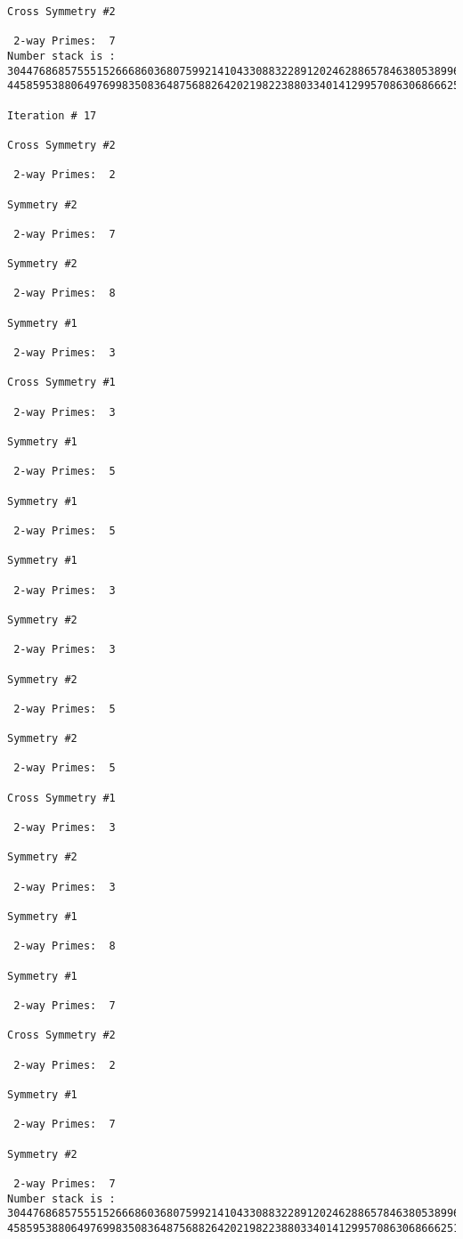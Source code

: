 \begin{verbatim}
Cross Symmetry #2

 2-way Primes: 	7
Number stack is :
30447686857555152666860368075992141043308832289120246288657846380538996794608835958544046240163340857
44585953880649769983508364875688264202198223880334014129957086306866625155575868674403758043361042640

Iteration #	17

Cross Symmetry #2

 2-way Primes: 	2

Symmetry #2

 2-way Primes: 	7

Symmetry #2

 2-way Primes: 	8

Symmetry #1

 2-way Primes: 	3

Cross Symmetry #1

 2-way Primes: 	3

Symmetry #1

 2-way Primes: 	5

Symmetry #1

 2-way Primes: 	5

Symmetry #1

 2-way Primes: 	3

Symmetry #2

 2-way Primes: 	3

Symmetry #2

 2-way Primes: 	5

Symmetry #2

 2-way Primes: 	5

Cross Symmetry #1

 2-way Primes: 	3

Symmetry #2

 2-way Primes: 	3

Symmetry #1

 2-way Primes: 	8

Symmetry #1

 2-way Primes: 	7

Cross Symmetry #2

 2-way Primes: 	2

Symmetry #1

 2-way Primes: 	7

Symmetry #2

 2-way Primes: 	7
Number stack is :
30447686857555152666860368075992141043308832289120246288657846380538996794608835958544046240163340857
45859538806497699835083648756882642021982238803340141299570863068666251555758686744037580433610426404


\end{verbatim}
